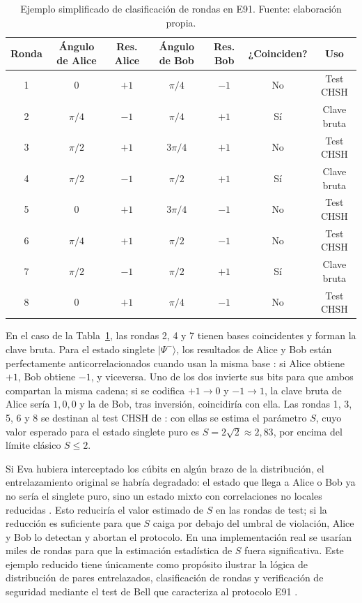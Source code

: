 \begin{table}[h]
    \centering
    \small
    \begin{tabular}{c c c c c c c}
        \hline\hline
        Ronda & Ángulo de Alice & Res. Alice & Ángulo de Bob & Res. Bob & ¿Coinciden? & Uso \\
        \hline
        1 & $0$      & $+1$ & $\pi/4$  & $-1$ & No  & Test CHSH \\
        2 & $\pi/4$  & $-1$ & $\pi/4$  & $+1$ & Sí  & Clave bruta \\
        3 & $\pi/2$  & $+1$ & $3\pi/4$ & $+1$ & No  & Test CHSH \\
        4 & $\pi/2$  & $-1$ & $\pi/2$  & $+1$ & Sí  & Clave bruta \\
        5 & $0$      & $+1$ & $3\pi/4$ & $-1$ & No  & Test CHSH \\
        6 & $\pi/4$  & $+1$ & $\pi/2$  & $-1$ & No  & Test CHSH \\
        7 & $\pi/2$  & $-1$ & $\pi/2$  & $+1$ & Sí  & Clave bruta \\
        8 & $0$      & $+1$ & $\pi/4$  & $-1$ & No  & Test CHSH \\
        \hline
    \end{tabular}
    \caption[Ejemplo de clasificación de rondas en E91]{Ejemplo simplificado de clasificación de rondas en E91. Fuente: elaboración propia.}
    \label{tab:e91_ejemplo}
\end{table}

En el caso de la Tabla~\ref{tab:e91_ejemplo}, las rondas 2, 4 y 7 tienen bases coincidentes y forman la clave bruta. Para el estado singlete $|\Psi^-\rangle$, los resultados de Alice y Bob están perfectamente anticorrelacionados cuando usan la misma base \citep{ekert1991}: si Alice obtiene $+1$, Bob obtiene $-1$, y viceversa. Uno de los dos invierte sus bits para que ambos compartan la misma cadena; si se codifica $+1 \to 0$ y $-1 \to 1$, la clave bruta de Alice sería $1, 0, 0$ y la de Bob, tras inversión, coincidiría con ella. Las rondas 1, 3, 5, 6 y 8 se destinan al test CHSH de \cite{clauser1969}: con ellas se estima el parámetro $S$, cuyo valor esperado para el estado singlete puro es $S = 2\sqrt{2} \approx 2{,}83$, por encima del límite clásico $S \leq 2$.

Si Eva hubiera interceptado los cúbits en algún brazo de la distribución, el entrelazamiento original se habría degradado: el estado que llega a Alice o Bob ya no sería el singlete puro, sino un estado mixto con correlaciones no locales reducidas \citep{ekert1991,acin2007}. Esto reduciría el valor estimado de $S$ en las rondas de test; si la reducción es suficiente para que $S$ caiga por debajo del umbral de violación, Alice y Bob lo detectan y abortan el protocolo. En una implementación real se usarían miles de rondas para que la estimación estadística de $S$ fuera significativa. Este ejemplo reducido tiene únicamente como propósito ilustrar la lógica de distribución de pares entrelazados, clasificación de rondas y verificación de seguridad mediante el test de Bell que caracteriza al protocolo E91 \citep{ekert1991,clauser1969}.
